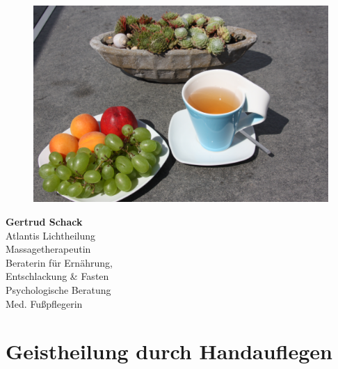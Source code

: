 \documentclass[10pt,foldmark,notumble]{leaflet}
\begin{document}
\begin{figure}[h] %
\begin{center}
\includegraphics [scale=.055]{Bild_Fasten.JPG}
\end{center}
\end{figure}

\begin{center}
{\LARGE \bf {Gertrud Schack}}\\
\vspace*{5mm}
\large {Atlantis Lichtheilung} \\ %
\vspace*{1mm}
\large {Massagetherapeutin} \\ 
\vspace*{1mm}
\large {Beraterin für Ernährung, } \\ %
\vspace*{1mm}
\large {Entschlackung \& Fasten} \\ 
\vspace*{1mm}
\large {Psychologische Beratung} \\ 
\vspace*{1mm}
\large {Med. Fußpflegerin} \\ 

\end{center}


\newpage
\section{Geistheilung durch Handauflegen}
\end{document}
